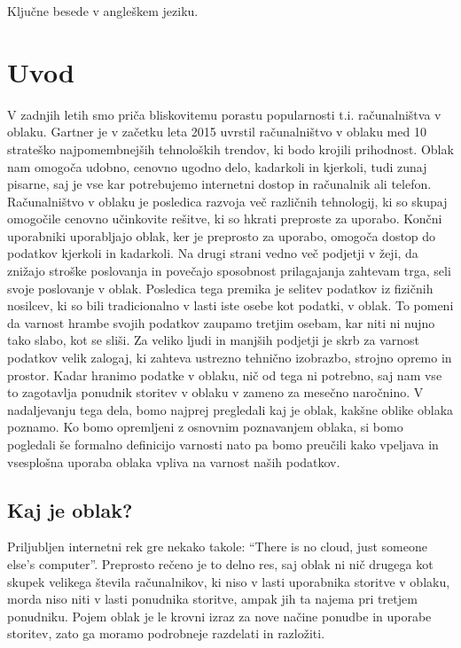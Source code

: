 \documentclass[12pt,a4paper,openany]{book}
\begin{document}
\vspace{0.5cm}
\noindent
Ključne besede v angleškem jeziku.



\chapter{Uvod}

V zadnjih letih smo priča bliskovitemu porastu popularnosti t.i. računalništva v oblaku. Gartner je v začetku leta 2015 uvrstil računalništvo v oblaku med 10 strateško najpomembnejših tehnoloških trendov, ki bodo krojili prihodnost. Oblak nam omogoča udobno, cenovno ugodno delo, kadarkoli in kjerkoli, tudi zunaj pisarne, saj je vse kar potrebujemo internetni dostop in računalnik ali telefon. Računalništvo v oblaku je posledica razvoja več različnih tehnologij, ki so skupaj omogočile cenovno učinkovite rešitve, ki so hkrati preproste za uporabo. Končni uporabniki uporabljajo oblak, ker je preprosto za uporabo, omogoča dostop do podatkov kjerkoli in kadarkoli. Na drugi strani vedno več podjetji v žeji, da znižajo stroške poslovanja in povečajo sposobnost prilagajanja zahtevam trga, seli svoje poslovanje v oblak. Posledica tega premika je selitev podatkov iz fizičnih nosilcev, ki so bili tradicionalno v lasti iste osebe kot podatki, v oblak. To pomeni da varnost hrambe svojih podatkov zaupamo tretjim osebam, kar niti ni nujno tako slabo, kot se sliši. Za veliko ljudi in manjših podjetji je skrb za varnost podatkov velik zalogaj, ki zahteva ustrezno tehnično izobrazbo, strojno opremo in prostor. Kadar hranimo podatke v oblaku, nič od tega ni potrebno, saj nam vse to zagotavlja ponudnik storitev v oblaku v zameno za mesečno naročnino. V nadaljevanju tega dela, bomo najprej pregledali kaj je oblak, kakšne oblike oblaka poznamo. Ko bomo opremljeni z osnovnim poznavanjem oblaka, si bomo pogledali še formalno definicijo varnosti nato pa bomo preučili kako vpeljava in vsesplošna uporaba oblaka vpliva na varnost naših podatkov. 

\section{Kaj je oblak?}
Priljubljen internetni rek gre nekako takole: “There is no cloud, just someone else's computer”. Preprosto rečeno je to delno res, saj oblak ni nič drugega kot skupek velikega števila računalnikov, ki niso v lasti uporabnika storitve v oblaku, morda niso niti v lasti ponudnika storitve, ampak jih ta najema pri tretjem ponudniku. Pojem oblak je le krovni izraz za nove načine ponudbe in uporabe storitev, zato ga moramo podrobneje razdelati in razložiti.
\end{document}
